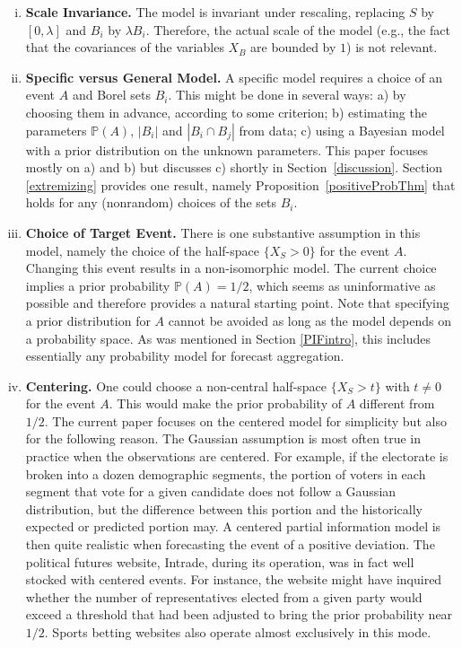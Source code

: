 \documentclass[11pt]{article}
\renewcommand{\P}{\mathbb{P}}
\theoremstyle{definition}
\theoremstyle{definition}
\def\P{{\mathbb P}}
\begin{document}
\begin{enumerate}[(i)]
\item {\bf Scale Invariance.} The model is invariant under rescaling,
replacing $S$ by $[0,\lambda]$ and $B_i$ by $\lambda B_i$.  Therefore,
the actual scale of the model (e.g., the fact that the covariances of
the variables $X_B$ are bounded by $1$) is not relevant.


\item {\bf Specific versus General Model.} A specific model requires a
choice of an event $A$ and Borel sets $B_i$.
This might be done in several ways: a) by choosing them in advance,
according to some criterion; b) estimating the parameters $\P(A)$,
$|B_i|$ and $|B_i \cap B_j|$ from data; c) using a Bayesian model
with a prior distribution on the unknown parameters.  This paper
focuses mostly on a) and b) but discusses c) shortly in
Section~\ref{discussion}.  Section \ref{extremizing} provides one
result, namely Proposition~\ref{positiveProbThm} that holds for any (nonrandom) choices of the sets $B_i$.
\label{item:specific}






\item {\bf Choice of Target Event.}  There is one substantive
assumption in this model, namely the choice of the half-space $\{ X_S
> 0 \}$ for the event $A$.  Changing this event results
in a non-isomorphic model. The current choice
implies a prior probability $\P(A) = 1/2$, which seems as
uninformative as possible and therefore provides a natural starting
point. Note that specifying a prior distribution for $A$ cannot be avoided as
long as the model depends on a probability space. As was mentioned in
Section \ref{PIFintro}, this includes essentially any probability
model for forecast aggregation.
\label{item:choice}

\item {\bf Centering.} One could choose a non-central half-space $\{
X_S > t \}$ with $t \neq 0$ for the event $A$.  This would make the prior
probability of $A$ different from $1/2$.  The current paper focuses on the
centered model for simplicity but also for the following reason.  The
Gaussian assumption is most often true in practice when the
observations are centered.  For example, if the electorate
is broken into a dozen demographic segments, the portion of voters in
each segment that vote for a given candidate does not follow a
Gaussian distribution, but the difference between this portion and the
historically expected or predicted portion may.  A centered partial
information model is then quite realistic when forecasting the event
of a positive deviation.  The political futures website, Intrade,
during its operation, was in fact well stocked with centered events. For instance, the website might have inquired whether 
 the number of representatives elected from a
given party would exceed a threshold that had been adjusted to
bring the prior probability near $1/2$.  Sports betting websites also operate
almost exclusively in this mode.
\label{item:centered}
\end{enumerate}
\end{document}
